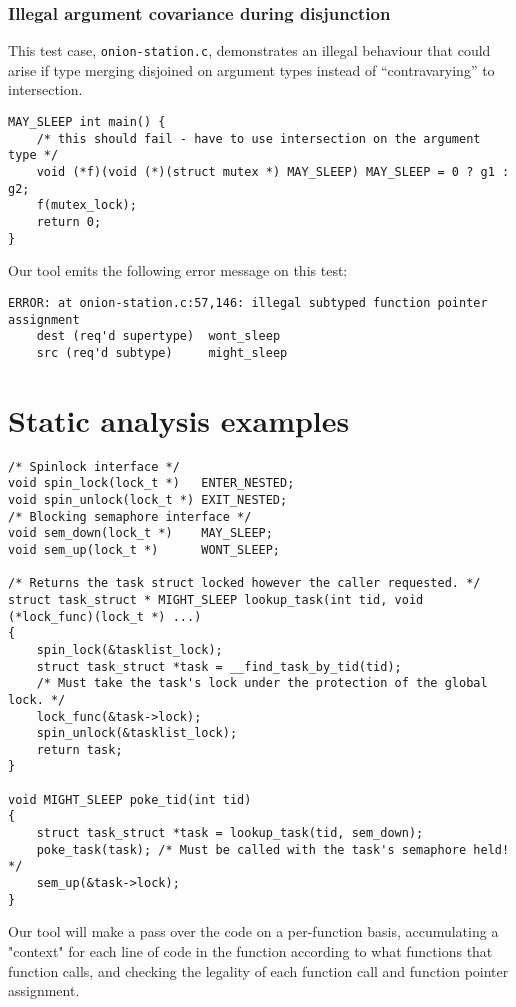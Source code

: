 \documentclass{article}
\begin{document}
\subsubsection{Illegal argument covariance during disjunction}

This test case, \texttt{onion-station.c}, demonstrates an illegal behaviour that could arise if type merging disjoined on argument types instead of ``contravarying'' to intersection.

\begin{verbatim}
MAY_SLEEP int main() {
    /* this should fail - have to use intersection on the argument type */
    void (*f)(void (*)(struct mutex *) MAY_SLEEP) MAY_SLEEP = 0 ? g1 : g2;
    f(mutex_lock);
    return 0;
}
\end{verbatim}

Our tool emits the following error message on this test:
\begin{verbatim}
ERROR: at onion-station.c:57,146: illegal subtyped function pointer assignment
    dest (req'd supertype)  wont_sleep
    src (req'd subtype)     might_sleep
\end{verbatim}

\section{Static analysis examples}

\begin{verbatim}
/* Spinlock interface */
void spin_lock(lock_t *)   ENTER_NESTED;
void spin_unlock(lock_t *) EXIT_NESTED;
/* Blocking semaphore interface */
void sem_down(lock_t *)    MAY_SLEEP;
void sem_up(lock_t *)      WONT_SLEEP;

/* Returns the task struct locked however the caller requested. */
struct task_struct * MIGHT_SLEEP lookup_task(int tid, void (*lock_func)(lock_t *) ...)
{
    spin_lock(&tasklist_lock);
    struct task_struct *task = __find_task_by_tid(tid);
    /* Must take the task's lock under the protection of the global lock. */
    lock_func(&task->lock);
    spin_unlock(&tasklist_lock);
    return task;
}

void MIGHT_SLEEP poke_tid(int tid)
{
    struct task_struct *task = lookup_task(tid, sem_down);
    poke_task(task); /* Must be called with the task's semaphore held! */
    sem_up(&task->lock);
}
\end{verbatim}

Our tool will make a pass over the code on a per-function basis, accumulating a "context" for each line of code in the function according to what functions that function calls, and checking the legality of each function call and function pointer assignment.
\end{document}
